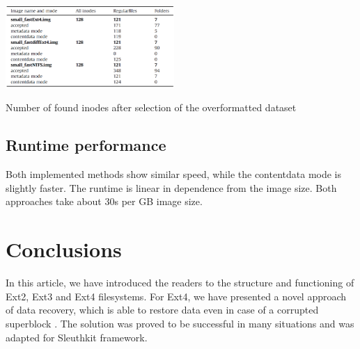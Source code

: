 \documentclass{acm_proc_article-sp}
\begin{document}
\begin{table}
\centering
\includegraphics[width=0.48\textwidth]{images/number.png}
	\caption{Number of found inodes after selection of the overformatted dataset}
\end{table}

\subsection{Runtime performance}

Both implemented methods show similar speed, while the contentdata mode is slightly faster. The runtime is linear in dependence from the image size. Both approaches take about 30s per GB image size.

\section{Conclusions}

In this article, we have introduced the readers to the structure and functioning of Ext2, Ext3 and Ext4 filesystems. For Ext4, we have presented a novel approach of data recovery, which is able to restore data even in case of a corrupted superblock \cite{afeic}. The solution was proved to be successful in many situations and was adapted for Sleuthkit framework.





\balancecolumns
\end{document}
